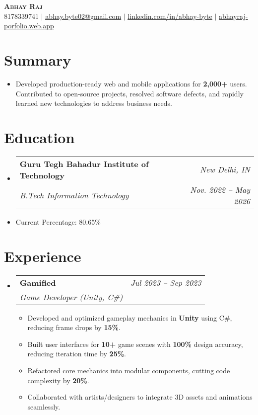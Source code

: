 \documentclass[letterpaper,11pt]{article}
\makeatletter
\newcommand{\resumeItem}[1]{
  \item\small{#1 \vspace{-2pt}}
}
\newcommand{\resumeSubheading}[4]{
  \vspace{-2pt}\item
  \begin{tabular*}{0.97\textwidth}[t]{l@{\extracolsep{\fill}}r}
    \textbf{#1} & \textit{\small #2} \\
    \textit{\small #3} & \textit{\small #4} \\
  \end{tabular*}\vspace{-7pt}
}
\newcommand{\resumeSubItem}[1]{\resumeItem{#1}\vspace{-4pt}}
\newcommand{\resumeSubHeadingListStart}{\begin{itemize}[leftmargin=0.15in, label={}]}
\newcommand{\resumeSubHeadingListEnd}{\end{itemize}}
\newcommand{\resumeItemListStart}{\begin{itemize}}
\newcommand{\resumeItemListEnd}{\end{itemize}\vspace{-5pt}}
\makeatother
\begin{document}
\begin{center}
  \textbf{\Huge \scshape Abhay Raj} \\ \vspace{1pt}
  \small 8178339741 $|$ \href{mailto:abhay.byte02@gmail.com}{\underline{abhay.byte02@gmail.com}} $|$
  \href{https://linkedin.com/in/abhay-byte}{\underline{linkedin.com/in/abhay-byte}} $|$
  \href{https://abhayraj-porfolio.web.app}{\underline{abhayraj-porfolio.web.app}}
\end{center}

\section{Summary}
\resumeSubHeadingListStart
  \resumeItem{Developed production-ready web and mobile applications for \textbf{2,000+} users. Contributed to open-source projects, resolved software defects, and rapidly learned new technologies to address business needs.}
\resumeSubHeadingListEnd

\section{Education}
\resumeSubHeadingListStart
  \resumeSubheading
    {Guru Tegh Bahadur Institute of Technology}{New Delhi, IN}
    {B.Tech Information Technology}{Nov. 2022 -- May 2026}
    \resumeSubItem{Current Percentage: 80.65\%}
\resumeSubHeadingListEnd
\section{Experience}
\resumeSubHeadingListStart
  \resumeSubheading
    {Gamified}{Jul 2023 -- Sep 2023}
    {Game Developer (Unity, C\#)}{}
    \resumeItemListStart
      \resumeItem{Developed and optimized gameplay mechanics in \textbf{Unity} using C\#, reducing frame drops by \textbf{15\%}.}
      \resumeItem{Built user interfaces for \textbf{10+} game scenes with \textbf{100\%} design accuracy, reducing iteration time by \textbf{25\%}.}
      \resumeItem{Refactored core mechanics into modular components, cutting code complexity by \textbf{20\%}.}
      \resumeItem{Collaborated with artists/designers to integrate 3D assets and animations seamlessly.}
    \resumeItemListEnd
\resumeSubHeadingListEnd


\end{document}
